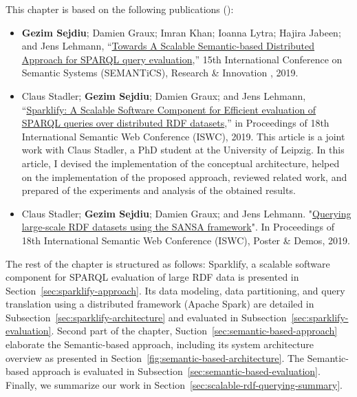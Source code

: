 This chapter is based on the following publications (\cite{sejdiu-2019-sansa-semantic-based-semantics,2019-sansa-sparklify-iswc, sansa-sparklify-ISWC-demo}):
\begin{itemize}
     \item \textbf{Gezim Sejdiu}; Damien Graux; Imran Khan; Ioanna Lytra; Hajira Jabeen; and Jens Lehmann, “\href{https://gezimsejdiu.github.io/publications/semantic_based_query_paper_SEMANTICS2019.pdf}{Towards A Scalable Semantic-based Distributed Approach for SPARQL query evaluation},” 15th International Conference on Semantic Systems (SEMANTiCS), Research \& Innovation , 2019.
     
    \item Claus Stadler; \textbf{Gezim Sejdiu}; Damien Graux; and Jens Lehmann, “\href{http://jens-lehmann.org/files/2019/iswc_sparklify.pdf}{Sparklify: A Scalable Software Component for Efficient evaluation of SPARQL queries over distributed RDF datasets},” in Proceedings of 18th International Semantic Web Conference (ISWC), 2019. 
    This article is a joint work with Claus Stadler, a PhD student at the University of Leipzig. 
    In this article, I devised the implementation of the conceptual architecture, helped on the implementation of the proposed approach, reviewed related work, and prepared of the experiments and analysis of the obtained results.
    
    \item Claus Stadler; \textbf{Gezim Sejdiu}; Damien Graux; and Jens Lehmann. "\href{https://gezimsejdiu.github.io/publications/sansa-sparklify-ISWC-demo.pdf}{Querying large-scale RDF datasets using the SANSA framework}".  In Proceedings of 18th International Semantic Web Conference (ISWC), Poster \& Demos, 2019.
\end{itemize}

The rest of the chapter is structured as follows:
Sparklify, a scalable software component for \gls{SPARQL} evaluation of large \gls{RDF} data is presented in Section~\ref{sec:sparklify-approach}.
Its data modeling, data partitioning, and query translation using a distributed framework (Apache Spark) are detailed in Subsection~\ref{sec:sparklify-architecture} and evaluated in Subsection~\ref{sec:sparklify-evaluation}.
Second part of the chapter, Suction~\ref{sec:semantic-based-approach} elaborate the Semantic-based approach, including its system architecture overview as presented in Section~\ref{fig:semantic-based-architecture}.
The Semantic-based approach is evaluated in Subsection~\ref{sec:semantic-based-evaluation}.
Finally, we summarize our work in  Section~\ref{sec:scalable-rdf-querying-summary}.


